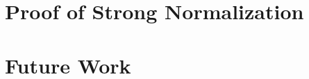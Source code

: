 \documentclass{easychair}
\begin{document}
\section{Proof of Strong Normalization}

\section{Future Work}
\end{document}
